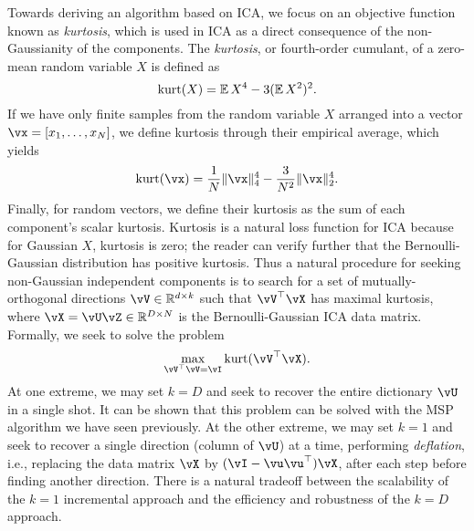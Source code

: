 \documentclass[../../book-main.tex]{subfiles}
\begin{document}
Towards deriving an algorithm based on ICA, we focus on an objective function known as \textit{kurtosis}, which is used in ICA as a direct consequence of the non-Gaussianity of the components. The \textit{kurtosis}, or fourth-order cumulant, of a zero-mean random variable $X$ is defined as
\begin{equation}\label{eq:kurtosis}
\mathop{\mathrm{kurt}}(X) = \operatorname{\mathbb{E}}{X^4} - 3 (\operatorname{\mathbb{E}}{X^2})^2.
\end{equation}
If we have only finite samples from the random variable $X$ arranged into a vector $\vx = [x_1, \dots, x_N]$, we define kurtosis through their empirical average, which yields
\begin{equation}\label{eq:kurtosis-vector}
\kurt(\vx) = \frac{1}{N} \norm{\vx}_4^4 - \frac{3}{N^2} \norm{\vx}_2^4.
\end{equation}
Finally, for random vectors, we define their kurtosis as the sum of each component's scalar kurtosis.
Kurtosis is a natural loss function for ICA because for Gaussian $X$, kurtosis is zero; the reader can verify further that the Bernoulli-Gaussian distribution has positive kurtosis. 
Thus a natural procedure for seeking non-Gaussian independent components is to search for a set of mutually-orthogonal directions $\vV \in \R^{d \times k}$ such that $\vV^\top \vX$ has maximal kurtosis, where $\vX = \vU \vZ \in \R^{D \times N}$ is the Bernoulli-Gaussian ICA data matrix.
Formally, we seek to solve the problem
\begin{equation}
    \max_{\vV^\top \vV = \vI} \kurt(\vV^\top \vX).
\end{equation}
At one extreme, we may set $k = D$ and seek to recover the entire dictionary
$\vU$ in a single shot.  It can be shown that this problem can be solved with
the MSP algorithm we have seen previously. 
At the other extreme, we may set $k=1$ and seek to recover a single direction (column of $\vU$) at a time, performing \textit{deflation}, i.e., replacing the data matrix $\vX$ by $(\vI - \vu\vu^\top) \vX$, after each step before finding another direction.
There is a natural tradeoff between the scalability of the $k=1$ incremental approach and the efficiency and robustness of the $k=D$ approach. 
\end{document}
